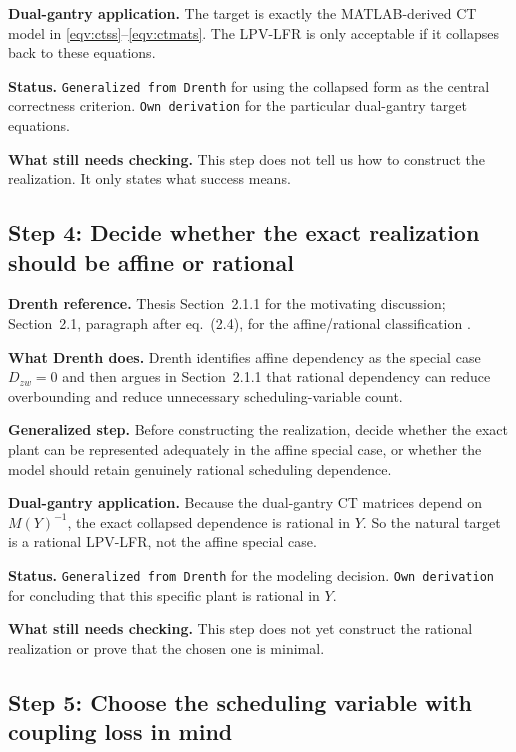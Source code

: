 \documentclass[11pt]{article}
\newcommand{\audititem}[2]{\par\smallskip\noindent\textbf{#1.} #2\par}
\newcommand{\statusline}[1]{\texttt{#1}}
\begin{document}
\audititem{Dual-gantry application}{The target is exactly the MATLAB-derived CT
model in \eqref{eqv:ctss}--\eqref{eqv:ctmats}. The LPV-LFR is only acceptable if
it collapses back to these equations.}

\audititem{Status}{\statusline{Generalized from Drenth} for using the collapsed
form as the central correctness criterion. \statusline{Own derivation} for the
particular dual-gantry target equations.}

\audititem{What still needs checking}{This step does not tell us how to
construct the realization. It only states what success means.}

\subsection{Step 4: Decide whether the exact realization should be affine or rational}

\audititem{Drenth reference}{Thesis Section~2.1.1 for the motivating discussion;
Section~2.1, paragraph after eq.~(2.4), for the affine/rational classification
\cite{drenth2025thesis}.}

\audititem{What Drenth does}{Drenth identifies affine dependency as the special
case $D_{zw}=0$ and then argues in Section~2.1.1 that rational dependency can
reduce overbounding and reduce unnecessary scheduling-variable count.}

\audititem{Generalized step}{Before constructing the realization, decide whether
the exact plant can be represented adequately in the affine special case, or
whether the model should retain genuinely rational scheduling dependence.}

\audititem{Dual-gantry application}{Because the dual-gantry CT matrices depend
on $M(Y)^{-1}$, the exact collapsed dependence is rational in $Y$. So the
natural target is a rational LPV-LFR, not the affine special case.}

\audititem{Status}{\statusline{Generalized from Drenth} for the modeling
decision. \statusline{Own derivation} for concluding that this specific plant is
rational in $Y$.}

\audititem{What still needs checking}{This step does not yet construct the
rational realization or prove that the chosen one is minimal.}

\subsection{Step 5: Choose the scheduling variable with coupling loss in mind}
\end{document}

